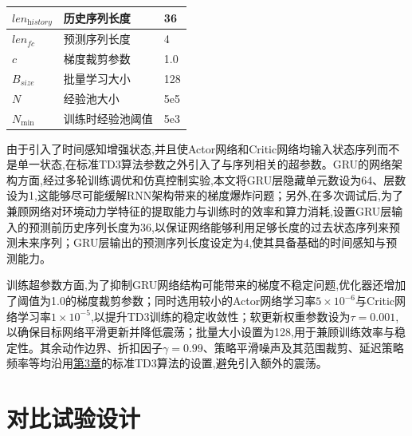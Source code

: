 \documentclass{scrbook}
\begin{document}
{\begin{table}
\begin{tabularx}{\textwidth}{|p{}|p{}|p{}|}
$len_{\textit{history}}$ & \raggedright\arraybackslash{}历史序列长度 & \raggedright\arraybackslash{}36\\\hline 
$len_{fc}$ & \raggedright\arraybackslash{}预测序列长度 & \raggedright\arraybackslash{}4\\\hline 
$c$ & \raggedright\arraybackslash{}梯度裁剪参数 & \raggedright\arraybackslash{}1.0\\\hline 
$B_{size}$ & \raggedright\arraybackslash{}批量学习大小 & \raggedright\arraybackslash{}128\\\hline 
$N$ & \raggedright\arraybackslash{}经验池大小 & \raggedright\arraybackslash{}5e5\\\hline 
$N_{\min }$ & \raggedright\arraybackslash{}训练时经验池阈值 & \raggedright\arraybackslash{}5e3\\\hline 
\end{tabularx}
\end{table}
由于引入了时间感知增强状态,并且使Actor网络和Critic网络均输入状态序列而不是单一状态,在标准TD3算法参数之外引入了与序列相关的超参数。GRU的网络架构方面,经过多轮训练调优和仿真控制实验,本文将GRU层隐藏单元数设为64、层数设为1,这能够尽可能缓解RNN架构带来的梯度爆炸问题；另外,在多次调试后,为了兼顾网络对环境动力学特征的提取能力与训练时的效率和算力消耗,设置GRU层输入的预测前历史序列长度为36,以保证网络能够利用足够长度的过去状态序列来预测未来序列；GRU层输出的预测序列长度设定为4,使其具备基础的时间感知与预测能力。

训练超参数方面,为了抑制GRU网络结构可能带来的梯度不稳定问题,优化器还增加了阈值为1.0的梯度裁剪参数；同时选用较小的Actor网络学习率$5\times 10^{-6}$与Critic网络学习率$1\times 10^{-5}$,以提升TD3训练的稳定收敛性；软更新权重参数设为$\tau =0.001$,以确保目标网络平滑更新并降低震荡；批量大小设置为128,用于兼顾训练效率与稳定性。其余动作边界、折扣因子$\gamma =0.99$、策略平滑噪声及其范围裁剪、延迟策略频率等均沿用{\hyperref[ref-041]{第3章}}的标准TD3算法的设置,避免引入额外的震荡。

\section{\label{ref-078}对比试验设计\label{mark-5.2}}

}
\end{document}

